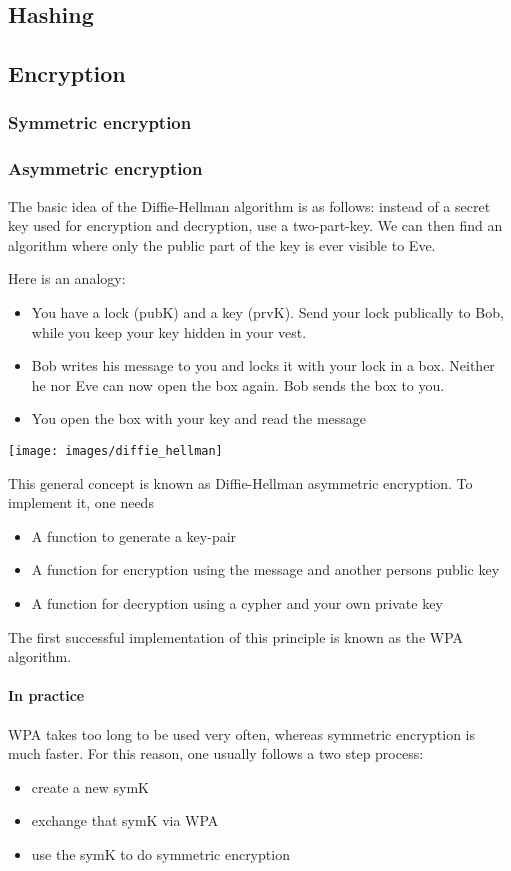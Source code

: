 \subsection{Hashing}

\subsection{Encryption}

\subsubsection{Symmetric encryption}

\subsubsection{Asymmetric encryption}

The basic idea of the Diffie-Hellman algorithm is as follows: instead of a secret key used for encryption and decryption, use a two-part-key. We can then find an algorithm where only the public part of the key is ever visible to Eve. 

Here is an analogy:
\begin{itemize}
	\item You have a lock (pubK) and a key (prvK). Send your lock publically to Bob, while you keep your key hidden in your vest. 
	\item Bob writes his message to you and locks it with your lock in a box. Neither he nor Eve can now open the box again. Bob sends the box to you.
	\item You open the box with your key and read the message
\end{itemize}

\texttt{[image: images/diffie\_hellman]}

This general concept is known as Diffie-Hellman asymmetric encryption. To implement it, one needs 
\begin{itemize}
	\item A function to generate a key-pair
	\item A function for encryption using the message and another persons public key
	\item A function for decryption using a cypher and your own private key
\end{itemize}
The first successful implementation of this principle is known as the WPA algorithm. 

\paragraph{In practice} WPA takes too long to be used very often, whereas symmetric encryption is much faster. For this reason, one usually follows a two step process:
\begin{itemize}
	\item create a new symK
	\item exchange that symK via WPA
	\item use the symK to do symmetric encryption
\end{itemize}

